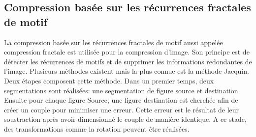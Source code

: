 \documentclass[a4paper]{report}
\begin{document}
	\subsection{Compression basée sur les récurrences fractales de motif}
		La compression basée sur les récurrences fractales de motif aussi appelée compression fractale est utilisée pour la compression d'image. Son principe est de détecter les récurrences de motifs et de supprimer les informations redondantes de l'image. Plusieurs méthodes existent mais la plus connue est la méthode Jacquin. Deux étapes composent cette méthode. Dans un premier temps, deux segmentations sont réalisées: une segmentation de figure source et destination. Ensuite pour chaque figure Source, une figure destination est cherchée afin de créer un couple pour minimiser une erreur. Cette erreur est le résultat de leur soustraction après avoir dimensionné le couple de manière identique. A ce stade, des transformations comme la rotation peuvent être réalisées.
		
         
\end{document}
